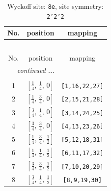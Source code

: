 \documentclass[fleqn,8pt]{jsarticle}
\begin{document}
\begin{longtable}{ccc}
\caption{Wyckoff site: {\tt 8e}, site symmetry: {\tt 2'2'2}}
 \\
 \hline \hline
No. & position & mapping \\ \hline \endfirsthead

\multicolumn{2}{l}{\tablename\ \thetable{}} \\
 \hline \hline
No. & position & mapping \\ \hline \endhead

 \hline \hline
\multicolumn{2}{r}{\footnotesize\it continued ...} \\ \endfoot

 \hline \hline
\multicolumn{2}{r}{} \\ \endlastfoot

1 & $\left[ \frac{1}{4},\, \frac{1}{4},\, 0 \right]$ & {\tt [1,16,22,27]} \\ \hline
2 & $\left[ \frac{1}{4},\, \frac{3}{4},\, 0 \right]$ & {\tt [2,15,21,28]} \\ \hline
3 & $\left[ \frac{3}{4},\, \frac{1}{4},\, 0 \right]$ & {\tt [3,14,24,25]} \\ \hline
4 & $\left[ \frac{3}{4},\, \frac{3}{4},\, 0 \right]$ & {\tt [4,13,23,26]} \\ \hline
5 & $\left[ \frac{1}{4},\, \frac{3}{4},\, \frac{1}{2} \right]$ & {\tt [5,12,18,31]} \\ \hline
6 & $\left[ \frac{1}{4},\, \frac{1}{4},\, \frac{1}{2} \right]$ & {\tt [6,11,17,32]} \\ \hline
7 & $\left[ \frac{3}{4},\, \frac{3}{4},\, \frac{1}{2} \right]$ & {\tt [7,10,20,29]} \\ \hline
8 & $\left[ \frac{3}{4},\, \frac{1}{4},\, \frac{1}{2} \right]$ & {\tt [8,9,19,30]} \\
\end{longtable}
\renewcommand{\arraystretch}{1.2}
\end{document}
